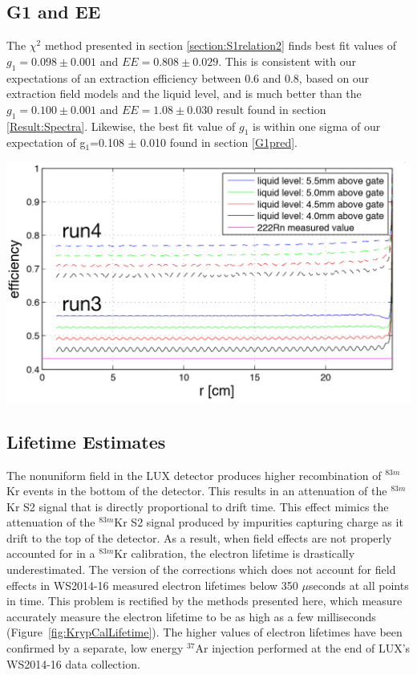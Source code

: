 \documentclass[a4paper,10pt,twocolumn]{article}
\begin{document}
\subsection{G1 and EE}

The $\chi^2$ method presented in section \ref{section:S1relation2} finds best fit values of $g_1=0.098 \pm 0.001$ and $EE=0.808 \pm 0.029$.  This is consistent with our expectations of an extraction efficiency between 0.6 and 0.8, based on our extraction field models and the liquid level, and is much better than the $g_1=0.100 \pm 0.001$ and $EE=1.08 \pm 0.030$ result found in section \ref{Result:Spectra}.  Likewise, the best fit value of $g_1$ is within one sigma of our expectation of g$_1$=0.108 $\pm$ 0.010 found in section \ref{G1pred}. 

\begin{center}
\includegraphics[scale=0.3]{Run04Corrections/GuschinEE.png}
 \label{EEexpec}
\end{center}


\subsection{Lifetime Estimates}

The nonuniform field in the LUX detector produces higher recombination of $^{83m}$Kr events in the bottom of the detector.  This results in an attenuation of the $^{83m}$Kr S2 signal that is directly proportional to drift time.  This effect mimics the attenuation of the $^{83m}$Kr S2 signal produced by impurities capturing charge as it drift to the top of the detector.  As a result, when field effects are not properly accounted for in a $^{83m}$Kr calibration, the electron lifetime is drastically underestimated.  The version of the corrections which does not account for field effects in WS2014-16 measured electron lifetimes below 350 $\mu$seconds at all points in time.  This problem is rectified by the methods presented here, which measure accurately measure the electron lifetime to be as high as a few milliseconds (Figure~\ref{fig:KrypCalLifetime}). The higher values of electron lifetimes have been confirmed by a separate, low energy $^{37}$Ar injection performed at the end of LUX's WS2014-16 data collection.
\end{document}
